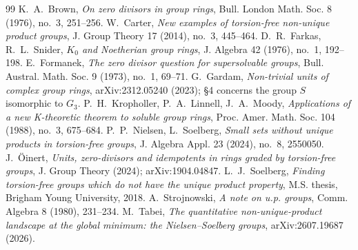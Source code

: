 \documentclass[10pt,a4paper]{amsart}
\newcommand{\GThree}{G_3}
\begin{document}
\begin{thebibliography}{99}
 K.~A.~Brown, \emph{On zero divisors in group rings}, Bull. London Math. Soc. 8 (1976), no.~3, 251--256.
 W.~Carter, \emph{New examples of torsion-free non-unique product groups}, J. Group Theory 17 (2014), no.~3, 445--464.
 D.~R.~Farkas, R.~L.~Snider, \emph{$K_0$ and Noetherian group rings}, J. Algebra 42 (1976), no.~1, 192--198.
 E.~Formanek, \emph{The zero divisor question for supersolvable groups}, Bull. Austral. Math. Soc. 9 (1973), no.~1, 69--71.
 G.~Gardam, \emph{Non-trivial units of complex group rings}, arXiv:2312.05240 (2023); \S4 concerns the group $S$ isomorphic to $\GThree$.
 P.~H.~Kropholler, P.~A.~Linnell, J.~A.~Moody, \emph{Applications of a new K-theoretic theorem to soluble group rings}, Proc. Amer. Math. Soc. 104 (1988), no.~3, 675--684.
 P.~P.~Nielsen, L.~Soelberg, \emph{Small sets without unique products in torsion-free groups}, J. Algebra Appl. 23 (2024), no.~8, 2550050.
 J.~\"Oinert, \emph{Units, zero-divisors and idempotents in rings graded by torsion-free groups}, J. Group Theory (2024); arXiv:1904.04847.
 L.~J.~Soelberg, \emph{Finding torsion-free groups which do not have the unique product property}, M.S. thesis, Brigham Young University, 2018.
 A.~Strojnowski, \emph{A note on u.p. groups}, Comm. Algebra 8 (1980), 231--234.
 M.~Tabei, \emph{The quantitative non-unique-product landscape at the global minimum: the Nielsen--Soelberg groups}, arXiv:2607.19687 (2026).
\end{thebibliography}
\end{document}

